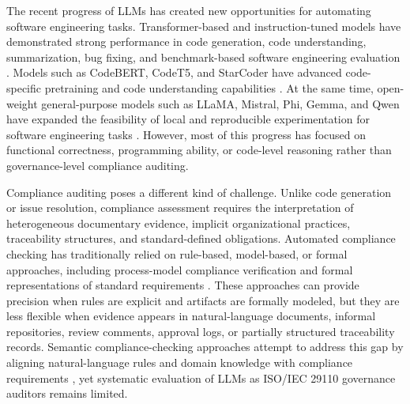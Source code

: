 \documentclass{ieeeaccess}
\begin{document}
The recent progress of LLMs has created new opportunities for automating software engineering tasks. Transformer-based and instruction-tuned models have demonstrated strong performance in code generation, code understanding, summarization, bug fixing, and benchmark-based software engineering evaluation \cite{jiang2024surveycodegen,lu2021codexglue,jimenez2023swebench,jain2024livecodebench}. Models such as CodeBERT, CodeT5, and StarCoder have advanced code-specific pretraining and code understanding capabilities \cite{feng2020codebert,wang2021codet5,li2023starcoder}. At the same time, open-weight general-purpose models such as LLaMA, Mistral, Phi, Gemma, and Qwen have expanded the feasibility of local and reproducible experimentation for software engineering tasks \cite{touvron2023llama,jiang2023mistral,abdin2024phi3,riviere2024gemma2,yang2024qwen25}. However, most of this progress has focused on functional correctness, programming ability, or code-level reasoning rather than governance-level compliance auditing.

Compliance auditing poses a different kind of challenge. Unlike code generation or issue resolution, compliance assessment requires the interpretation of heterogeneous documentary evidence, implicit organizational practices, traceability structures, and standard-defined obligations. Automated compliance checking has traditionally relied on rule-based, model-based, or formal approaches, including process-model compliance verification and formal representations of standard requirements \cite{castellanos2022processcompliance,castellanos2018spem,sirikrajai2025cpn,tuaycharoen2025auditorviews}. These approaches can provide precision when rules are explicit and artifacts are formally modeled, but they are less flexible when evidence appears in natural-language documents, informal repositories, review comments, approval logs, or partially structured traceability records. Semantic compliance-checking approaches attempt to address this gap by aligning natural-language rules and domain knowledge with compliance requirements \cite{guo2021semantic,zheng2022semantic}, yet systematic evaluation of LLMs as ISO/IEC 29110 governance auditors remains limited.
\end{document}
